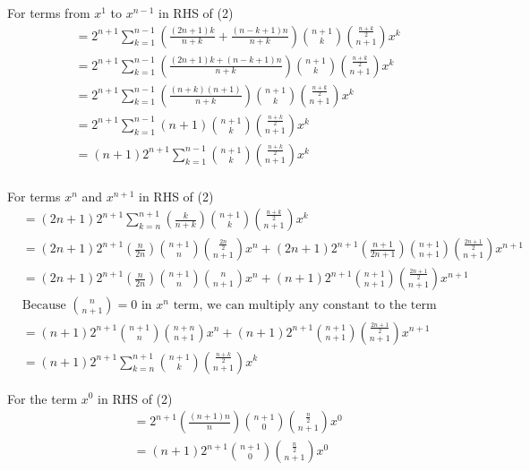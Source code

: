 \documentclass{article}
\begin{document}
For terms from $x^1$ to $x^{n-1}$ in RHS of (2)
\begin{equation}
  \begin{split}
    &= 2^{n+1} \sum_{k=1}^{n-1} \left(\frac{ (2n+1) k}{n+k} + \frac{(n-k+1)n}{n+k} \right) \binom{n+1}{k} \binom{\frac{n+k}{2}}{n+1} x^{k}\\
    &= 2^{n+1} \sum_{k=1}^{n-1} \left(\frac{ (2n+1) k + (n-k+1)n}{n+k} \right) \binom{n+1}{k} \binom{\frac{n+k}{2}}{n+1} x^{k}\\
    &= 2^{n+1} \sum_{k=1}^{n-1} \left(\frac{ (n + k)(n+1) }{n+k} \right) \binom{n+1}{k} \binom{\frac{n+k}{2}}{n+1} x^{k}\\
    &= 2^{n+1} \sum_{k=1}^{n-1} (n+1) \binom{n+1}{k} \binom{\frac{n+k}{2}}{n+1} x^{k}\\
    &=  (n+1) 2^{n+1} \sum_{k=1}^{n-1}\binom{n+1}{k} \binom{\frac{n+k}{2}}{n+1} x^{k}\\
  \end{split}
\end{equation}

For terms $x^{n}$ and $x^{n+1}$ in RHS of (2)
\begin{equation}
  \begin{split}
    &= (2n+1) 2^{n+1} \sum_{k=n}^{n+1} \left( \frac{k}{n+k} \right) \binom{n+1}{k} \binom{\frac{n+k}{2}}{n+1} x^{k}\\
    &= (2n+1) 2^{n+1} \left( \frac{n}{2n} \right) \binom{n+1}{n} \binom{\frac{2n}{2}}{n+1} x^{n} + (2n+1) 2^{n+1} \left( \frac{n+1}{2n+1} \right) \binom{n+1}{n+1} \binom{\frac{2n+1}{2}}{n+1} x^{n+1}\\
    &= (2n+1) 2^{n+1} \left( \frac{n}{2n} \right) \binom{n+1}{n} \binom{n}{n+1} x^{n} + (n+1)2^{n+1} \binom{n+1}{n+1} \binom{\frac{2n+1}{2}}{n+1} x^{n+1}\\
    &\text{Because }\binom{n}{n+1} = 0 \text{ in $x^n$ term, we can multiply any constant to the term}\\
    &= (n+1) 2^{n+1}  \binom{n+1}{n} \binom{n+n}{n+1} x^{n} + (n+1)2^{n+1} \binom{n+1}{n+1} \binom{\frac{2n+1}{2}}{n+1} x^{n+1}\\
    &= (n+1) 2^{n+1} \sum_{k=n}^{n+1} \binom{n+1}{k} \binom{\frac{n+k}{2}}{n+1} x^k
  \end{split}
\end{equation}

For the term $x^{0}$  in RHS of (2)
\begin{equation}
  \begin{split}
    &= 2^{n+1} \left(  \frac{(n+1)n }{n}\right)  \binom{n+1}{0}   \binom{\frac{n}{2}}{n+1} x^0\\
    &= (n+1) 2^{n+1}  \binom{n+1}{0}   \binom{\frac{n}{2}}{n+1} x^0\\
  \end{split}
\end{equation}
\end{document}
